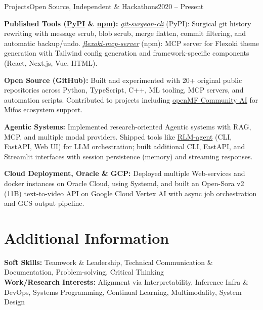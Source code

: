 \documentclass[10pt, letterpaper]{article}
\newcommand{\skill}[2]{\textbf{#1:} #2}
\begin{document}
\begin{experienceentry}{Projects}{Open Source, Independent \& Hackathons}{2020 -- Present}
    \item \textbf{Published Tools (\href{https://pypi.org/user/Raghav-56/}{PyPI} \& \href{https://www.npmjs.com/~raghav-56}{npm}):} \href{https://pypi.org/project/git-surgeon-cli/}{\textit{git-surgeon-cli}} (PyPI): Surgical git history rewriting with message scrub, blob scrub, merge flatten, commit filtering, and automatic backup/undo. \href{https://www.npmjs.com/package/@raghav-56/flexoki-mcp-server}{\textit{flexoki-mcp-server}} (npm): MCP server for Flexoki theme generation with Tailwind config generation and framework-specific components (React, Next.js, Vue, HTML).
    \item \textbf{Open Source (GitHub):} Built and experimented with 20+ original public repositories across Python, TypeScript, C++, ML tooling, MCP servers, and automation scripts. Contributed to projects including \href{https://github.com/openMF/community-ai}{openMF Community AI} for Mifos ecosystem support.
    \item \textbf{Agentic Systems:} Implemented research-oriented Agentic systems with RAG, MCP, and multiple modal providers. Shipped tools like \href{https://github.com/Raghav-56/RLM-agent}{RLM-agent} (CLI, FastAPI, Web UI) for LLM orchestration; built additional CLI, FastAPI, and Streamlit interfaces with session persistence (memory) and streaming responses.
    \item \textbf{Cloud Deployment, Oracle \& GCP:} Deployed multiple Web-services and docker instances on Oracle Cloud, using Systemd, and built an Open-Sora v2 (11B) text-to-video API on Google Cloud Vertex AI with async job orchestration and GCS output pipeline.
\end{experienceentry}


\section{Additional Information}
\skill{Soft Skills}{Teamwork \& Leadership, Technical Communication \& Documentation, Problem-solving, Critical Thinking}\\[0.05cm]
\skill{Work/Research Interests}{Alignment via Interpretability, Inference Infra \& DevOps, Systems Programming, Continual Learning, Multimodality, System Design}\\[0.05cm]


\end{document}
